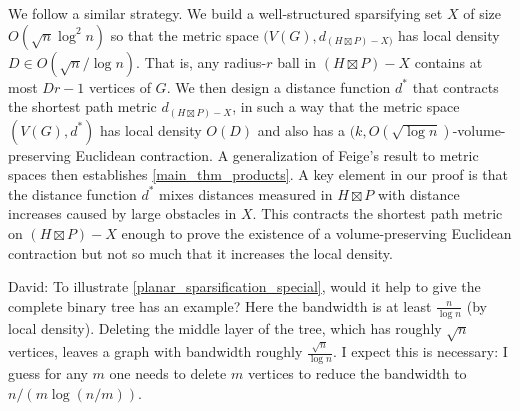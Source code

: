 \documentclass{patmorin}
\newcommand{\david}[1]{{\color{orange} David: #1}}
\begin{document}
We follow a similar strategy.  We build a well-structured sparsifying set $X$ of size $O(\sqrt{n}\log^2 n)$ so that the metric space $(V(G),d_{(H\boxtimes P)-X)}$ has local density $D\in O(\sqrt{n}/\log n)$.  That is, any radius-$r$ ball in $(H\boxtimes P)-X$ contains at most $Dr-1$ vertices of $G$.  We then design a distance function $d^*$ that contracts the shortest path metric $d_{(H\boxtimes P)-X}$, in such a way that the metric space $(V(G),d^*)$ has local density $O(D)$ and also has a $(k,O(\sqrt{\log n})$-volume-preserving Euclidean contraction.  A generalization of Feige's result to metric spaces then establishes \cref{main_thm_products}.  A key element in our proof is that the distance function $d^*$ mixes distances measured in $H\boxtimes P$ with distance increases caused by large obstacles in $X$. This contracts the shortest path metric on $(H\boxtimes P)-X$ enough to prove the existence of a volume-preserving Euclidean contraction but not so much that it increases the local density.



\david{To illustrate \cref{planar_sparsification_special}, would it help to give the complete binary tree has an example? Here the bandwidth is at least $\frac{n}{\log n}$ (by local density). Deleting the middle layer of the tree, which has roughly $\sqrt{n}$ vertices, leaves a graph with bandwidth roughly $\frac{\sqrt{n}}{\log n}$. I expect this is necessary: I guess for any $m$ one needs to delete $m$ vertices to reduce the bandwidth to $n/( m\log(n/m))$. }
\end{document}
